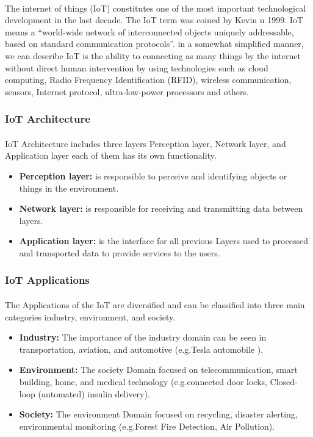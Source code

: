 \documentclass[12pt, oneside, a4paper]{book}
\newcommand\boldcolor[1]{\textcolor{bold}{\textbf{#1}}}
\begin{document}
			\paragraph{}The internet of things (IoT) constitutes one of the most important technological
			development in the last decade. The IoT term was coined by Kevin n 1999\cite{iot_1}. IoT
			means a “world-wide network of interconnected objects uniquely addressable, based
			on standard communication protocols”\cite{iot_2}. in a somewhat simplified manner, we
			can describe IoT is the ability to connecting as many things by the internet without
			direct human intervention by using technologies such as cloud computing, Radio
			Frequency Identification (RFID), wireless communication, sensors, Internet
			protocol, ultra-low-power processors and others\cite{iot_3}.
			\subsubsection{IoT Architecture}
			\paragraph{} IoT Architecture includes three layers Perception layer, Network layer, and
			Application layer each of them has its own functionality.
			\begin{itemize}
				\item \boldcolor{Perception layer:} is responsible to perceive and identifying objects or things in the
				environment.
				\item \boldcolor{Network layer:} is responsible for receiving and transmitting data between layers.
				\item \boldcolor{Application layer:} is the interface for all previous Layers used to processed and
				transported data to provide services to the users\cite{iot_4}.
			\end{itemize}
			\subsubsection{IoT Applications}
			\paragraph{}The Applications of the IoT are diversified and can be classified into three main
			categories industry, environment, and society.
			\begin{itemize}
			\item \boldcolor{Industry:} The importance of the industry domain can be seen in transportation,
			aviation, and automotive (e.g.Tesla automobile ).
			\item \boldcolor{Environment:} The society Domain focused on telecommunication, smart building,
			home, and medical technology (e.g.connected door locks, Closed-loop (automated)
			insulin delivery).
			\item \boldcolor{Society:} The environment Domain focused on recycling, disaster alerting,
			environmental monitoring (e.g.Forest Fire Detection, Air Pollution)\cite{iot_5}.
			\end{itemize}
\end{document}
